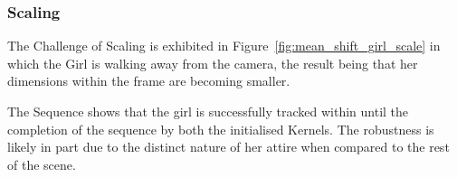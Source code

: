 \subsubsection{Scaling}
The Challenge of Scaling is exhibited in Figure~\ref{fig:mean_shift_girl_scale}
in which the Girl is walking away from the camera, the result being that her
dimensions within the frame are becoming smaller.

The Sequence shows that the girl is successfully tracked within until the
completion of the sequence by both the initialised Kernels. The robustness is
likely in part due to the distinct nature of her attire when compared to the
rest of the scene. 

\begin{figure} 
\end{figure}
